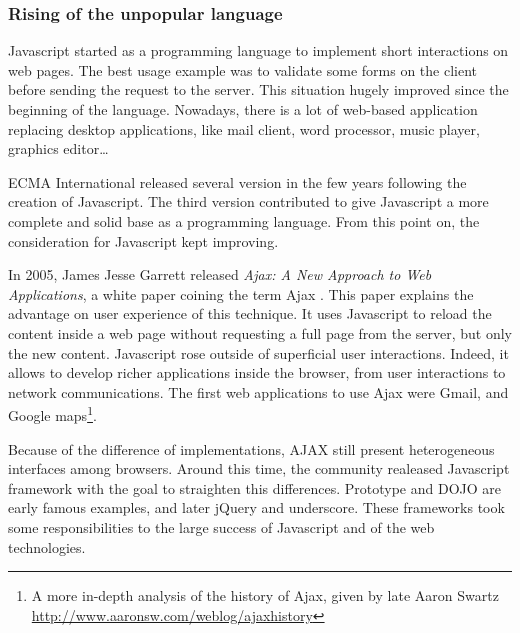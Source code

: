 \subsubsection{Rising of the unpopular language}

Javascript started as a programming language to implement short interactions on web pages.
The best usage example was to validate some forms on the client before sending the request to the server.
This situation hugely improved since the beginning of the language.
Nowadays, there is a lot of web-based application replacing desktop applications, like mail client, word processor, music player, graphics editor…


ECMA International released several version in the few years following the creation of Javascript.
The third version %
contributed to give Javascript a more complete and solid base as a programming language.
From this point on, the consideration for Javascript kept improving.

In 2005, James Jesse Garrett released \textit{Ajax: A New Approach to Web Applications}, a white paper coining the term Ajax \cite{Garrett2005}.
This paper explains the advantage on user experience of this technique.
It uses Javascript to reload the content inside a web page without requesting a full page from the server, but only the new content.
Javascript rose outside of superficial user interactions.
Indeed, it allows to develop richer applications inside the browser, from user interactions to network communications.
The first web applications to use Ajax were Gmail, and Google maps\footnote{A more in-depth analysis of the history of Ajax, given by late Aaron Swartz \url{http://www.aaronsw.com/weblog/ajaxhistory}}.

Because of the difference of implementations, AJAX still present heterogeneous interfaces among browsers.
Around this time, the community realeased Javascript framework with the goal to straighten this differences.
Prototype and DOJO are early famous examples, and later jQuery and underscore.
These frameworks took some responsibilities to the large success of Javascript and of the web technologies.

